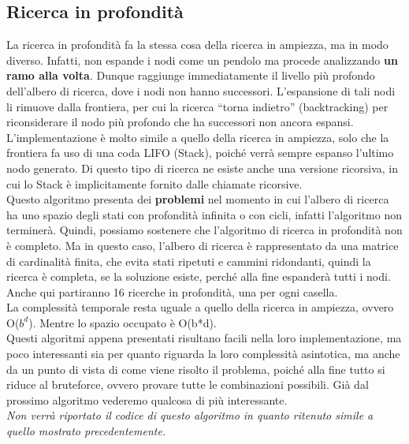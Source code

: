 \documentclass[10pt,a4paper]{article}
\begin{document}
	\subsection{Ricerca in profondità}
	La ricerca in profondità fa la stessa cosa della ricerca in ampiezza, ma in modo diverso. Infatti, non espande i nodi come un pendolo ma procede analizzando \textbf{un ramo alla volta}. Dunque raggiunge immediatamente il livello più profondo dell'albero di ricerca, dove i nodi non hanno successori. L’espansione di tali nodi li rimuove dalla frontiera, per cui la ricerca “torna indietro” (backtracking) per riconsiderare il nodo più profondo che ha successori non ancora espansi. L'implementazione è molto simile a quello della ricerca in ampiezza, solo che la frontiera fa uso di una coda LIFO (Stack), poiché verrà sempre espanso l’ultimo nodo generato. Di questo tipo di ricerca ne esiste anche una versione ricorsiva, in cui lo Stack è implicitamente fornito dalle chiamate ricorsive.\\
	Questo algoritmo presenta dei \textbf{problemi} nel momento in cui l’albero di ricerca ha uno spazio degli stati con profondità infinita o con cicli, infatti l’algoritmo non terminerà. Quindi, possiamo sostenere che l’algoritmo di ricerca in profondità non è completo.
	Ma in questo caso, l'albero di ricerca è rappresentato da una matrice di cardinalità finita, che evita stati ripetuti e cammini ridondanti, quindi la ricerca è completa, se la soluzione esiste, perché alla fine espanderà tutti i nodi.\\
	Anche qui partiranno 16 ricerche in profondità, una per ogni casella.\\
	La complessità temporale resta uguale a quello della ricerca in ampiezza, ovvero O($b^d$). Mentre lo spazio occupato è O(b*d).\\
	Questi algoritmi appena presentati risultano facili nella loro implementazione, ma poco interessanti sia per quanto riguarda la loro complessità asintotica, ma anche da un punto di vista di come viene risolto il problema, poiché alla fine tutto si riduce al bruteforce, ovvero provare tutte le combinazioni possibili. Già dal prossimo algoritmo vederemo qualcosa di più interessante.\\
	\small{\textit{Non verrà riportato il codice di questo algoritmo in quanto ritenuto simile a quello mostrato precedentemente.}}\\
\end{document}
